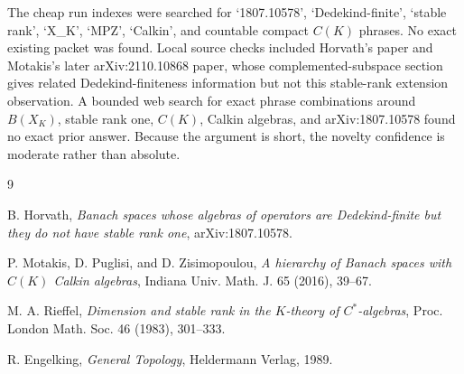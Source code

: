 \documentclass[11pt]{amsart}
\begin{document}
The cheap run indexes were searched for `1807.10578', `Dedekind-finite',
`stable rank', `X\_K', `MPZ', `Calkin', and countable compact \(C(K)\) phrases.
No exact existing packet was found.  Local source checks included Horvath's
paper and Motakis's later arXiv:2110.10868 paper, whose complemented-subspace
section gives related Dedekind-finiteness information but not this stable-rank
extension observation.  A bounded web search for exact phrase combinations
around \(B(X_K)\), stable rank one, \(C(K)\), Calkin algebras, and
arXiv:1807.10578 found no exact prior answer.  Because the argument is short,
the novelty confidence is moderate rather than absolute.

\begin{thebibliography}{9}

B. Horvath,
\emph{Banach spaces whose algebras of operators are Dedekind-finite but they
do not have stable rank one},
arXiv:1807.10578.

P. Motakis, D. Puglisi, and D. Zisimopoulou,
\emph{A hierarchy of Banach spaces with \(C(K)\) Calkin algebras},
Indiana Univ. Math. J. 65 (2016), 39--67.

M. A. Rieffel,
\emph{Dimension and stable rank in the \(K\)-theory of \(C^*\)-algebras},
Proc. London Math. Soc. 46 (1983), 301--333.

R. Engelking,
\emph{General Topology},
Heldermann Verlag, 1989.

\end{thebibliography}
\end{document}
